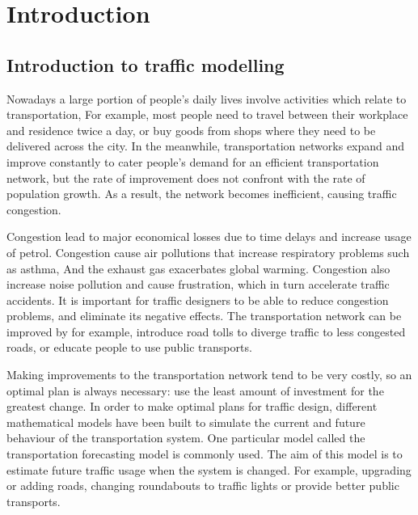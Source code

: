 \chapter{Introduction}



\section{Introduction to traffic modelling}

Nowadays a large portion of people's daily lives involve activities which relate to transportation,
For example, most people need to travel between their workplace and residence twice a day,
or buy goods from shops where they need to be delivered across the city.
In the meanwhile, 
transportation networks expand and improve constantly to cater people's demand for an efficient transportation network,
but the rate of improvement does not confront with the rate of population growth.
As a result,
the network becomes inefficient, causing traffic congestion.

Congestion lead to major economical losses due to time delays and increase usage of petrol.
Congestion cause air pollutions that increase respiratory problems such as asthma, 
And the exhaust gas exacerbates global warming.
Congestion also increase noise pollution and cause frustration,
which in turn accelerate traffic accidents.
It is important for traffic designers to be able to reduce congestion problems,
and eliminate its negative effects.
The transportation network can be improved by for example,
introduce road tolls to diverge traffic to less congested roads,
or educate people to use public transports.

Making improvements to the transportation network tend to be very costly,
so an optimal plan is always necessary:
use the least amount of investment for the greatest change.
In order to make optimal plans for traffic design,
different mathematical models have been built to simulate the current and future behaviour of the transportation system.
One particular model called the transportation forecasting model is commonly used.
The aim of this model is to estimate future traffic usage when the system is changed.
For example, upgrading or adding roads, changing roundabouts to traffic lights or provide better public transports. 

